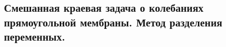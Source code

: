 \subsection{Смешанная краевая задача о колебаниях прямоугольной мембраны. Метод разделения переменных.}